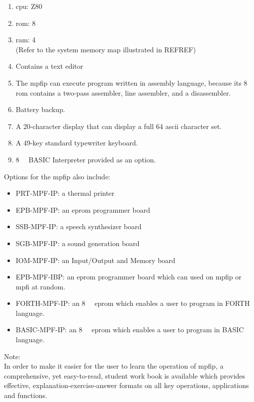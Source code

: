 \begin{enumerate}[label=\arabic*), noitemsep, leftmargin=*, parsep=0em]
    \item \gls{cpu}: Z80
    \item \gls{rom}: \SI{8}{\kibi\byte}
    \item \gls{ram}: \SI{4}{\kibi\byte} \\(Refer to the system memory map illustrated in REFREF)
    \item Contains a text editor
    \item The \gls{mpfip} can execute program written in assembly language, because its \SI{8}{\kibi\byte} \gls{rom} contains a two-pass assembler, line assembler, and a disassembler.
    \item Battery backup.
    \item A 20-character display that can display a full 64 \gls{ascii} character set.
    \item A 49-key standard typewriter keyboard.
    \item \SI{8}{\kibi\byte} BASIC Interpreter provided as an option.
\end{enumerate}

Options for the \gls{mpfip} also include:

\begin{itemize}[label=*, noitemsep, leftmargin=*, parsep=0em]
    \item PRT-MPF-IP: a thermal printer
    \item EPB-MPF-IP: an \gls{eprom} programmer board
    \item SSB-MPF-IP: a speech synthesizer board
    \item SGB-MPF-IP: a sound generation board
    \item IOM-MPF-IP: an Input/Output and Memory board
    \item EPB-MPF-IBP: an \gls{eprom} programmer board which can used on \gls{mpfip} or \gls{mpfi} at random.
    \item FORTH-MPF-IP: an \SI{8}{\kibi\byte} \gls{eprom} which enables a user to program in FORTH language.
    \item BASIC-MPF-IP: an \SI{8}{\kibi\byte} \gls{eprom} which enables a user to program in BASIC language.
\end{itemize}

Note:\\
\hspace*{2em} In order to make it easier for the user to learn the operation of \gls{mpfip}, a comprehensive, yet easy-to-read, student work book is available which provides effective, explanation-exercise-answer formats on all key operations, applications and functions.

